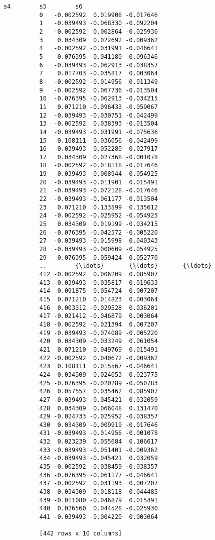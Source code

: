 \documentclass[11pt]{article}
\begin{document}
\begin{Verbatim}[commandchars=\\\{\}]
                     s4        s5        s6  
          0   -0.002592  0.019908 -0.017646  
          1   -0.039493 -0.068330 -0.092204  
          2   -0.002592  0.002864 -0.025930  
          3    0.034309  0.022692 -0.009362  
          4   -0.002592 -0.031991 -0.046641  
          5   -0.076395 -0.041180 -0.096346  
          6   -0.039493 -0.062913 -0.038357  
          7    0.017703 -0.035817  0.003064  
          8   -0.002592 -0.014956  0.011349  
          9   -0.002592  0.067736 -0.013504  
          10  -0.076395 -0.062913 -0.034215  
          11   0.071210 -0.096433 -0.059067  
          12  -0.039493 -0.030751 -0.042499  
          13  -0.002592  0.038393 -0.013504  
          14  -0.039493 -0.031991 -0.075636  
          15   0.108111  0.036056 -0.042499  
          16  -0.039493  0.052280  0.027917  
          17   0.034309  0.027368 -0.001078  
          18  -0.002592 -0.018118 -0.017646  
          19  -0.039493 -0.008944 -0.054925  
          20  -0.039493 -0.011901  0.015491  
          21  -0.039493 -0.072128 -0.017646  
          22  -0.039493 -0.061177 -0.013504  
          23   0.071210  0.133599  0.135612  
          24  -0.002592 -0.025952 -0.054925  
          25   0.034309  0.019199 -0.034215  
          26  -0.076395 -0.042572 -0.005220  
          27  -0.039493 -0.015998  0.040343  
          28  -0.039493 -0.000609 -0.054925  
          29  -0.076395  0.059424  0.052770  
          ..        {\ldots}       {\ldots}       {\ldots}  
          412 -0.002592  0.006209  0.085907  
          413 -0.039493 -0.035817  0.019633  
          414  0.091875  0.054724  0.007207  
          415  0.071210  0.014823  0.003064  
          416  0.003312 -0.029528  0.036201  
          417 -0.021412 -0.046879  0.003064  
          418 -0.002592 -0.021394  0.007207  
          419 -0.039493 -0.074089 -0.005220  
          420  0.034309 -0.033249  0.061054  
          421  0.071210  0.049769  0.015491  
          422 -0.002592  0.040672 -0.009362  
          423  0.108111  0.015567 -0.046641  
          424  0.034309  0.024053  0.023775  
          425 -0.076395 -0.020289 -0.050783  
          426  0.057557  0.035462  0.085907  
          427 -0.039493 -0.045421  0.032059  
          428  0.034309  0.066048  0.131470  
          429 -0.024733 -0.025952 -0.038357  
          430  0.034309 -0.009919 -0.017646  
          431 -0.039493 -0.014956 -0.001078  
          432  0.023239  0.055684  0.106617  
          433 -0.039493 -0.051401 -0.009362  
          434 -0.039493 -0.045421  0.032059  
          435 -0.002592 -0.038459 -0.038357  
          436 -0.076395 -0.061177 -0.046641  
          437 -0.002592  0.031193  0.007207  
          438  0.034309 -0.018118  0.044485  
          439 -0.011080 -0.046879  0.015491  
          440  0.026560  0.044528 -0.025930  
          441 -0.039493 -0.004220  0.003064  
          
          [442 rows x 10 columns]
\end{Verbatim}
            
\end{document}
